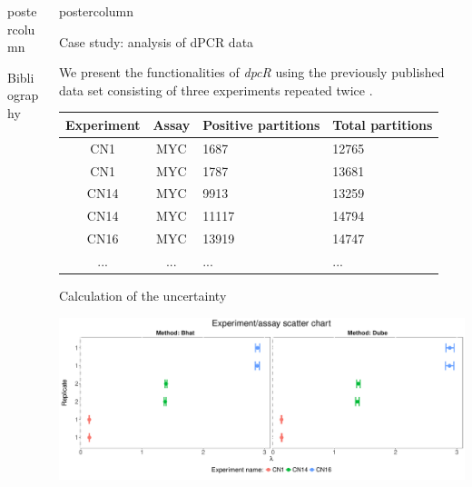 \documentclass[final]{beamer}\usepackage[]{graphicx}\usepackage[]{color}
\makeatletter
\def\maxwidth{ %
  \ifdim\Gin@nat@width>\linewidth
    \linewidth
  \else
    \Gin@nat@width
  \fi
}
\newlength{\columnheight}
\makeatother
\begin{document}
\begin{frame}
\begin{columns}
\begin{column}{.46\textwidth}
\begin{beamercolorbox}[center,wd=\textwidth]{postercolumn}
\begin{minipage}[T]{.95\textwidth}
{\begin{block}{Bibliography}
\tiny{


}
\end{block}
\vfill

}
\end{minipage}
\end{beamercolorbox}
\end{column}



\begin{column}{.54\textwidth}
\begin{beamercolorbox}[center,wd=\textwidth]{postercolumn}
\begin{minipage}[T]{.95\textwidth}  
\parbox[t][\columnheight]{\textwidth}
{

\begin{block}{Case study: analysis of dPCR data}

We present the functionalities of \textit{dpcR} using the previously published data set consisting of three experiments repeated twice \citep{dorazio_statistical_2015}.

\begin{table}[ht]
\centering
\begin{tabular}{ccll}
  \toprule
Experiment & Assay & Positive partitions & Total partitions \\ 
  \midrule
CN1 & MYC & 1687 & 12765 \\ 
   \rowcolor{white}CN1 & MYC & 1787 & 13681 \\ 
  CN14 & MYC & 9913 & 13259 \\ 
   \rowcolor{white}CN14 & MYC & 11117 & 14794 \\ 
  CN16 & MYC & 13919 & 14747 \\ 
   \rowcolor{white}... & ... & ... & ... \\ 
   \bottomrule
\end{tabular}
\end{table}


\end{block}
\vfill

\begin{block}{Calculation of the uncertainty}


\includegraphics[width=\maxwidth]{figure/cs1-1} 



\end{block}}
\end{minipage}
\end{beamercolorbox}
\end{column}
\end{columns}
\end{frame}
\end{document}
